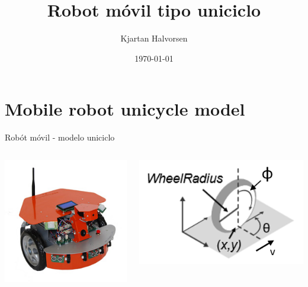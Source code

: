 \documentclass[presentation,aspectratio=169]{beamer}
\author{Kjartan Halvorsen}
\date{\today}
\title{Robot móvil tipo uniciclo}
\begin{document}
\maketitle

\section{Mobile robot unicycle model}
\label{sec:org7522043}

\begin{frame}[label={sec:orgdef3f17}]{Robót móvil - modelo uniciclo}
\begin{columns}
\begin{column}{0.4\columnwidth}
\begin{center}
 \includegraphics[width=.8\linewidth]{../figures/X80Pro.jpg}
\end{center}
\end{column}




\begin{column}{0.4\columnwidth}
\begin{center}
 \includegraphics[width=1.0\linewidth]{../figures/unicycle_annotated.png}
\end{center}
\end{column}
\end{columns}
\end{frame}
\end{document}
